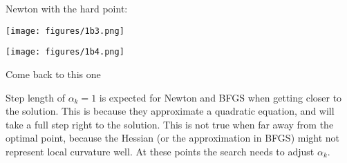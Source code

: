 Newton with the hard point: 

\begin{minipage}[c]{0.5\textwidth}
  \centering
  \texttt{[image: figures/1b3.png]}
\end{minipage}
\hfill
\begin{minipage}[c]{0.5\textwidth}
  \centering
  \texttt{[image: figures/1b4.png]}
\end{minipage}
  

Come back to this one 


Step length of $\alpha_k = 1$ is expected for Newton and BFGS when getting closer to the solution.
This is because they approximate a quadratic equation, and will take a full step right to the solution. This is not 
true when far away from the optimal point, because the Hessian (or the approximation in BFGS) might not represent local curvature well. 
At these points the search needs to adjust $\alpha_k$.
